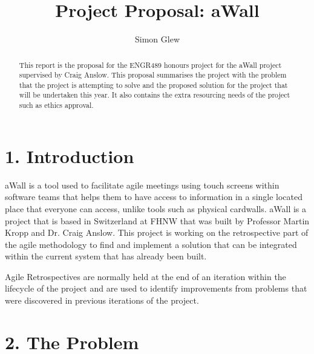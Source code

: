 \documentclass[11pt, a4paper, twoside, openright]{report}
\title{Project Proposal: aWall}
\author{Simon Glew}
\date{}
\begin{document}
\frontmatter


\begin{abstract}
  This report is the proposal for the ENGR489 honours project for the aWall project supervised by Craig Anslow. This proposal summarises the project with the problem that the project is attempting to solve and the proposed solution for the project that will be undertaken this year. It also contains the extra resourcing needs of the project such as ethics approval. 
\end{abstract}


\maketitle




\mainmatter


\section*{1. Introduction}

aWall is a tool used to facilitate agile meetings using touch screens within software teams that helps them to have access to information in a single located place that everyone can access, unlike tools such as physical cardwalls. aWall is a project that is based in Switzerland at FHNW that was built by Professor Martin Kropp and Dr. Craig Anslow. 
This project is working on the retrospective part of the agile methodology to find and implement a solution that can be integrated within the current system that has already been built.  

Agile Retrospectives are normally held at the end of an iteration within the lifecycle of the project and are used to identify improvements from problems that were discovered in previous iterations of the project. 


\section*{2. The Problem}
\end{document}
